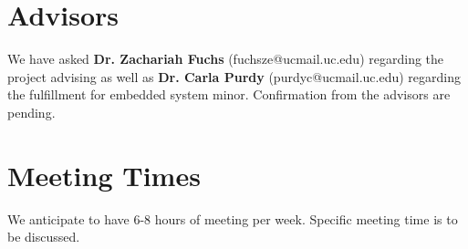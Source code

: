 \documentclass[]{article}
\begin{document}
\section{Advisors}
We have asked \textbf{Dr. Zachariah Fuchs} (fuchsze@ucmail.uc.edu) regarding the project advising as well as \textbf{Dr. Carla Purdy} (purdyc@ucmail.uc.edu) regarding the fulfillment for embedded system minor. Confirmation from the advisors are pending.

\section{Meeting Times}
We anticipate to have 6-8 hours of meeting per week. Specific meeting time is to be discussed. 
\end{document}
